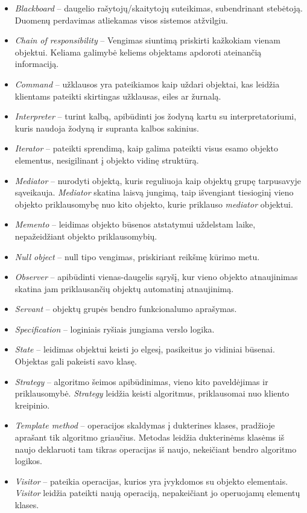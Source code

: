 \documentclass[10pt]{IEEEtran}
\begin{document}
			\begin{itemize}
				\item \textit{Blackboard} -- daugelio rašytojų/skaitytojų suteikimas, subendrinant stebėtoją. Duomenų perdavimas atliekamas visos sistemos atžvilgiu.
				\item \textit{Chain of responsibility} -- Vengimas siuntimą priskirti kažkokiam vienam objektui. Keliama galimybė keliems objektams apdoroti ateinančią informaciją.
				\item \textit{Command} -- užklausos yra pateikiamos kaip uždari objektai, kas leidžia klientams pateikti skirtingas užklausas, eiles ar žurnalą.
				\item \textit{Interpreter} -- turint kalbą, apibūdinti jos žodyną kartu su interpretatoriumi, kuris naudoja žodyną ir supranta kalbos sakinius.
				\item \textit{Iterator} -- pateikti sprendimą, kaip galima pateikti visus esamo objekto elementus, nesigilinant į objekto vidinę struktūrą.
				\item \textit{Mediator} -- nurodyti objektą, kuris reguliuoja kaip objektų grupę tarpusavyje sąveikauja. \textit{Mediator} skatina laisvą jungimą, taip išvengiant tiesioginį vieno objekto priklausomybę nuo kito objekto, kurie priklauso \textit{mediator} objektui. 
				\item \textit{Memento} -- leidimas objekto būsenos atstatymui uždelstam laike, nepažeidžiant objekto priklausomybių.
				\item \textit{Null object} -- null tipo vengimas, priskiriant reikšmę kūrimo metu.
				\item \textit{Observer} -- apibūdinti vienas-daugelis sąryšį, kur vieno objekto atnaujinimas skatina jam priklausančių objektų automatinį atnaujinimą.
				\item \textit{Servant} -- objektų grupės bendro funkcionalumo aprašymas.
				\item \textit{Specification} -- loginiais ryšiais jungiama verslo logika.
				\item \textit{State} -- leidimas objektui keisti jo elgesį, pasikeitus jo vidiniai būsenai. Objektas gali pakeisti savo klasę.
				\item \textit{Strategy} -- algoritmo šeimos apibūdinimas, vieno kito paveldėjimas ir priklausomybė. \textit{Strategy} leidžia keisti algoritmus, priklausomai nuo kliento kreipinio.
				\item \textit{Template method} -- operacijos skaldymas į dukterines klases, pradžioje aprašant tik algoritmo griaučius. Metodas leidžia dukterinėms klasėms iš naujo deklaruoti tam tikras operacijas iš naujo, nekeičiant bendro algoritmo logikos.
				\item \textit{Visitor} -- pateikia operacijas, kurios yra įvykdomos su objekto elementais. \textit{Visitor} leidžia pateikti naują operaciją, nepakeičiant jo operuojamų elementų klases. 
			\end{itemize}
\end{document}

